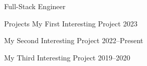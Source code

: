 \documentclass{cv}
\begin{document}
\cvheader
{Full-Stack Engineer} %
{
	{} %
	{}
	{}
	{}
	{}
	{}
} %
{\lipsum[1][1-5]} %

\begin{skills} %
	\faitem{\faCode} \lipsum[4][1]
	\faitem{\faLinux} \lipsum[4][2]
	\faitem{\faDatabase} \lipsum[4][3]
	\faitem{\faChartBar} \lipsum[4][4]
	\columnbreak
	\faitem{\faGit*} \lipsum[4][5]
	\faitem{\faProjectDiagram} \lipsum[4][6]
	\faitem{\faCogs} \lipsum[4][7]
	\faitem{\faCloud} \lipsum[4][8]
\end{skills}


\begin{career}
    { %
    \begin{careersection}{Projects}
        \careeritem
	{My First Interesting Project} %
        {2023} %
        {} %
        { %
        \begin{careeritemdetails}
	\item \lipsum[5][1-2] 
	\item \lipsum[5][3-4]
	\item \lipsum[5][4-5]
        \end{careeritemdetails}
        }
        \careeritem
	{My Second Interesting Project} %
        {2022--Present} %
        {} %
        { %
        \begin{careeritemdetails}
	\item \lipsum[6][1-2] 
	\item \lipsum[6][3-4]
	\item \lipsum[6][5-6]
        \end{careeritemdetails}
        }
        \careeritem
	{My Third Interesting Project} %
        {2019--2020} %
        {} %
        { %
        \begin{careeritemdetails}
	\item \lipsum[7][1-2] 
	\item \lipsum[7][3-4]
	\item \lipsum[7][5-6]
        \end{careeritemdetails}
}
\end{careersection}}
\end{career}
\end{document}

